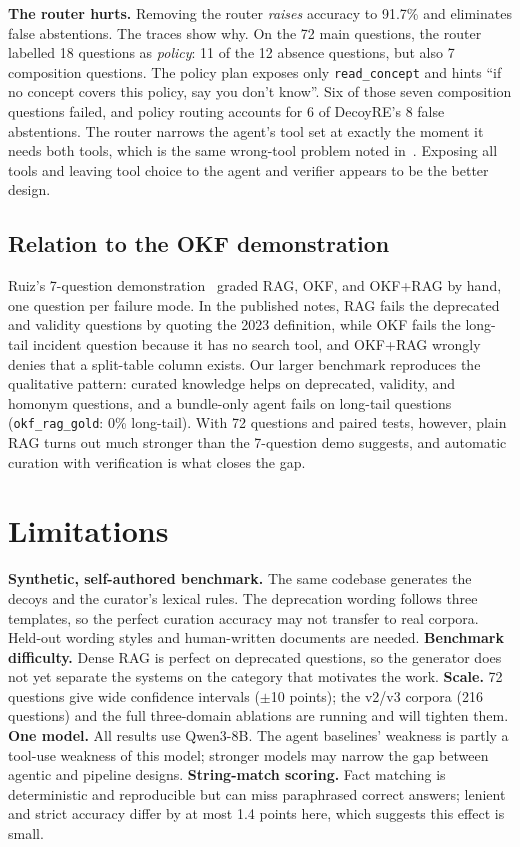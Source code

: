 \documentclass[conference]{IEEEtran}
\newcommand{\sys}[1]{\texttt{#1}}
\begin{document}
\textbf{The router hurts.} Removing the router \emph{raises} accuracy to 91.7\% and eliminates false abstentions.
The traces show why. On the 72 main questions, the router labelled 18 questions as \emph{policy}: 11 of the 12 absence
questions, but also 7 composition questions. The policy plan exposes only \sys{read\_concept} and
hints ``if no concept covers this policy, say you don't know''. Six of those seven composition questions failed, and
policy routing accounts for 6 of DecoyRE's 8 false abstentions. The router narrows the agent's tool set at exactly the
moment it needs both tools, which is the same wrong-tool problem noted in~\cite{ruiz2026okf}. Exposing all tools and
leaving tool choice to the agent and verifier appears to be the better design.

\subsection{Relation to the OKF demonstration}
Ruiz's 7-question demonstration~\cite{ruiz2026okf} graded RAG, OKF, and OKF+RAG by hand, one question per failure mode.
In the published notes, RAG fails the deprecated and validity questions by quoting the 2023 definition, while OKF fails
the long-tail incident question because it has no search tool, and OKF+RAG wrongly denies that a split-table column exists.
Our larger benchmark reproduces the qualitative pattern: curated knowledge helps on deprecated, validity, and homonym
questions, and a bundle-only agent fails on long-tail questions (\sys{okf\_rag\_gold}: 0\% long-tail). With 72 questions
and paired tests, however, plain RAG turns out much stronger than the 7-question demo suggests, and automatic curation
with verification is what closes the gap.

\section{Limitations}
\label{sec:limits}
\textbf{Synthetic, self-authored benchmark.} The same codebase generates the decoys and the curator's lexical rules.
The deprecation wording follows three templates, so the perfect curation accuracy may not transfer to real corpora.
Held-out wording styles and human-written documents are needed.
\textbf{Benchmark difficulty.} Dense RAG is perfect on deprecated questions, so the generator does not yet separate the
systems on the category that motivates the work.
\textbf{Scale.} 72 questions give wide confidence intervals ($\pm$10 points); the v2/v3 corpora (216 questions) and
the full three-domain ablations are running and will tighten them.
\textbf{One model.} All results use Qwen3-8B. The agent baselines' weakness is partly a tool-use weakness of this model;
stronger models may narrow the gap between agentic and pipeline designs.
\textbf{String-match scoring.} Fact matching is deterministic and reproducible but can miss paraphrased correct answers;
lenient and strict accuracy differ by at most 1.4 points here, which suggests this effect is small.
\end{document}
